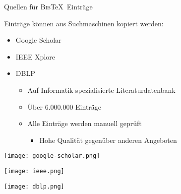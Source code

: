 \documentclass[aspectratio=169]{beamer}
\providecommand{\tightlist}{\setlength{\itemsep}{0pt}\setlength{\parskip}{0pt}}
\newcommand\citestyle[1]{\textcolor{foreground-secondary}{\textsuperscript{#1}}}
\let\oldautocite\autocite
\renewcommand{\autocite}[1]{\citestyle{\oldautocite{#1}}}
\begin{document}
    \begin{frame}{Quellen für \textsc{Bib}\TeX~Einträge}
    \protect\hypertarget{quellen-fuxfcr-eintruxe4ge}{}
    \begin{minipage}{0.7\textwidth}

    Einträge können aus Suchmaschinen kopiert werden:\\

    \begin{itemize}
    \tightlist
    \item
      Google Scholar \autocite{google-scholar}
    \item
      IEEE Xplore \autocite{ieee-xplore}
    \item
      DBLP\normalsize~\autocite{dblp}

      \begin{itemize}
      \tightlist
      \item
        Auf Informatik spezialisierte Literaturdatenbank
      \item
        Über 6.000.000 Einträge
      \item
        Alle Einträge werden manuell geprüft

        \begin{itemize}
        \tightlist
        \item
          Hohe Qualität gegenüber anderen Angeboten
        \end{itemize}
      \end{itemize}
    \end{itemize}

    \end{minipage}\begin{minipage}{0.3\textwidth}

    \vfill

    \hfill \texttt{[image: google-scholar.png]}

    \vspace{.5\baselineskip}

    \hfill \texttt{[image: ieee.png]}

    \vspace{.5\baselineskip}

    \texttt{[image: dblp.png]}

    \end{minipage}
    \end{frame}
\end{document}

